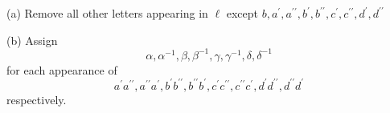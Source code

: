 (a) Remove all other letters appearing in \(\ell\) except \(b,{a}^{\prime },{a}^{\prime \prime },{b}^{\prime },{b}^{\prime \prime },{c}^{\prime },{c}^{\prime \prime },{d}^{\prime },{d}^{\prime \prime }\)

(b) Assign
\[
\alpha,{\alpha }^{-1},\beta,{\beta }^{-1},\gamma,{\gamma }^{-1},\delta,{\delta }^{-1}
\]
for each appearance of
\[
{a}^{\prime }{a}^{\prime \prime },{a}^{\prime \prime }{a}^{\prime },{b}^{\prime }{b}^{\prime \prime },{b}^{\prime \prime }{b}^{\prime },{c}^{\prime }{c}^{\prime \prime },{c}^{\prime \prime }{c}^{\prime },{d}^{\prime }{d}^{\prime \prime },{d}^{\prime \prime }{d}^{\prime }
\]
respectively.